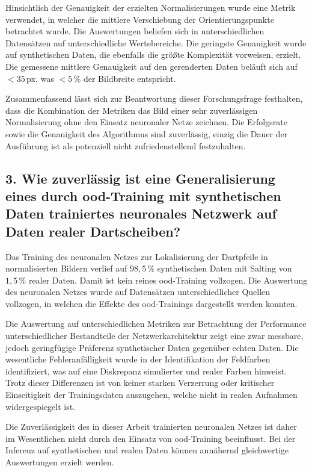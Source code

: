 Hinsichtlich der Genauigkeit der erzielten Normalisierungen wurde eine Metrik verwendet, in welcher die mittlere Verschiebung der Orientierungspunkte betrachtet wurde. Die Auswertungen beliefen sich in unterschiedlichen Datensätzen auf unterschiedliche Wertebereiche. Die geringste Genauigkeit wurde auf synthetischen Daten, die ebenfalls die größte Komplexität vorweisen, erzielt. Die gemessene mittlere Genauigkeit auf den gerenderten Daten beläuft sich auf $< 35\,\text{px}$, was $< 5\,\%$ der Bildbreite entspricht.

Zusammenfassend lässt sich zur Beantwortung dieser Forschungsfrage festhalten, dass die Kombination der Metriken das Bild einer sehr zuverlässigen Normalisierung ohne den Einsatz neuronaler Netze zeichnen. Die Erfolgsrate sowie die Genauigkeit des Algorithmus sind zuverlässig, einzig die Dauer der Ausführung ist als potenziell nicht zufriedenstellend festzuhalten.

\subsection*{3. Wie zuverlässig ist eine Generalisierung eines durch \ac{ood}-Training mit synthetischen Daten trainiertes neuronales Netzwerk auf Daten realer Dartscheiben?}

Das Training des neuronalen Netzes zur Lokalisierung der Dartpfeile in normalisierten Bildern verlief auf $98,5\,\%$ synthetischen Daten mit Salting von $1,5\,\%$ realer Daten. Damit ist kein reines \ac{ood}-Training vollzogen. Die Auswertung des neuronalen Netzes wurde auf Datensätzen unterschiedlicher Quellen vollzogen, in welchen die Effekte des \ac{ood}-Trainings dargestellt werden konnten.

Die Auswertung auf unterschiedlichen Metriken zur Betrachtung der Performance unterschiedlicher Bestandteile der Netzwerkarchitektur zeigt eine zwar messbare, jedoch geringfügige Präferenz synthetischer Daten gegenüber echten Daten. Die wesentliche Fehleranfälligkeit wurde in der Identifikation der Feldfarben identifiziert, was auf eine Diskrepanz simulierter und realer Farben hinweist. Trotz dieser Differenzen ist von keiner starken Verzerrung oder kritischer Einseitigkeit der Trainingsdaten auszugehen, welche nicht in realen Aufnahmen widergespiegelt ist.

Die Zuverlässigkeit des in dieser Arbeit trainierten neuronalen Netzes ist daher im Wesentlichen nicht durch den Einsatz von \ac{ood}-Training beeinflusst. Bei der Inferenz auf synthetischen und realen Daten können annähernd gleichwertige Auswertungen erzielt werden.

